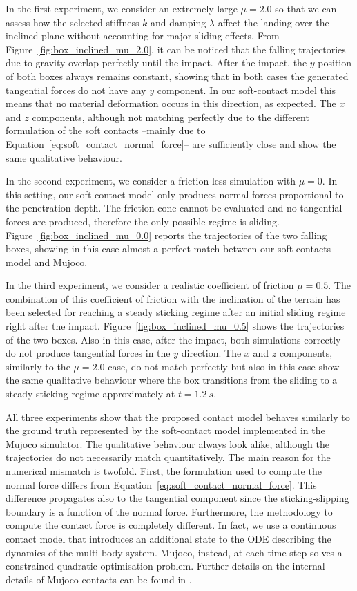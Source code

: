 In the first experiment, we consider an extremely large $\mu = 2.0$ so that we can assess how the selected stiffness $k$ and damping $\lambda$ affect the landing over the inclined plane without accounting for major sliding effects.
From Figure~\ref{fig:box_inclined_mu_2.0}, it can be noticed that the falling trajectories due to gravity overlap perfectly until the impact.
After the impact, the $y$ position of both boxes always remains constant, showing that in both cases the generated tangential forces do not have any $y$ component.
In our soft-contact model this means that no material deformation occurs in this direction, as expected.
The $x$ and $z$ components, although not matching perfectly due to the different formulation of the soft contacts --mainly due to Equation~\eqref{eq:soft_contact_normal_force}-- are sufficiently close and show the same qualitative behaviour.

In the second experiment, we consider a friction-less simulation with $\mu = 0$.
In this setting, our soft-contact model only produces normal forces proportional to the penetration depth.
The friction cone cannot be evaluated and no tangential forces are produced, therefore the only possible regime is sliding.
Figure~\ref{fig:box_inclined_mu_0.0} reports the trajectories of the two falling boxes, showing in this case almost a perfect match between our soft-contacts model and Mujoco.

In the third experiment, we consider a realistic coefficient of friction $\mu = 0.5$.
The combination of this coefficient of friction with the inclination of the terrain has been selected for reaching a steady sticking regime after an initial sliding regime right after the impact.
Figure~\ref{fig:box_inclined_mu_0.5} shows the trajectories of the two boxes.
Also in this case, after the impact, both simulations correctly do not produce tangential forces in the $y$ direction.
The $x$ and $z$ components, similarly to the $\mu = 2.0$ case, do not match perfectly but also in this case show the same qualitative behaviour where the box transitions from the sliding to a steady sticking regime approximately at $t=1.2~s$.

All three experiments show that the proposed contact model behaves similarly to the ground truth represented by the soft-contact model implemented in the Mujoco simulator.
The qualitative behaviour always look alike, although the trajectories do not necessarily match quantitatively.
The main reason for the numerical mismatch is twofold.
First, the formulation used to compute the normal force differs from Equation~\eqref{eq:soft_contact_normal_force}.
This difference propagates also to the tangential component since the sticking-slipping boundary is a function of the normal force.
Furthermore, the methodology to compute the contact force is completely different.
In fact, we use a continuous contact model that introduces an additional state to the \ac{ODE} describing the dynamics of the multi-body system.
Mujoco, instead, at each time step solves a constrained quadratic optimisation problem.
Further details on the internal details of Mujoco contacts can be found in \parencite{todorov_convex_2014, vousten_simulating_2022, yoon_comparative_2023}.

